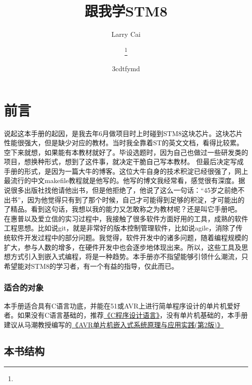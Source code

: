 \documentclass[a4paper]{book}
\title{{跟我学STM8}}
\author{Larry Cai}
\title{\huge{\savedtitle}}
\author{\textbf{\savedauthor}\thanks{}}
\date{\w3cdtfymd}
\begin{document}
\thispagestyle{empty}
\setcounter{tocdepth}{4}

\frontmatter
\chapter*{前言}

说起这本手册的起因，是我去年6月做项目时上时碰到STM8这块芯片。这块芯片性能很强大，但是缺少对应的教材。当时我全靠着ST的英文文档，看得比较累。空下来就想，如果能有本教材就好了。毕设选题时，因为自己也做过一些研发类的项目，想换种形式，想到了这件事，就决定干脆自己写本教材。 但最后决定写成手册的形式，是因为一篇大牛的博客。这位大牛自身的技术积淀已经很强了，网上最流行的中文makefile教程就是他写的。他写的博文我经常看，感觉很有深度。据说很多出版社找他请他出书，但是他拒绝了，他说了这么一句话：“45岁之前绝不出书”，因为他觉得只有到了那个时候，自己才可能得到足够的积淀，才可能出的了精品。看到这句话，我想以我的能力又怎敢称之为教材呢？还是叫它手册吧。 在惠普以及爱立信的实习过程中，我接触了很多软件方面好用的工具，成熟的软件工程思想。比如说git，就是非常好的版本控制管理软件，比如说agile，消除了传统软件开发过程中的部分问题。我觉得，软件开发中的诸多问题，随着编程规模的扩大，参与人数的增多，在硬件开发中也会逐步地体现出来。所以，这些工具及思想方式引入到嵌入式编程，将是一种趋势。本手册亦不指望能够引领什么潮流，只希望能对STM8的学习者，有一个有益的指导，仅此而已。

\subsection*{适合的对象}

本手册适合具有C语言功底，并能在51或AVR上进行简单程序设计的单片机爱好者。如果没有C语言基础的，推荐\href{http://product.china-pub.com/14975\&ref=browse}{《C程序设计语言》}，没有单片机基础的，本手册建议从马潮教授编写的\href{http://www.amazon.cn/AVR\%E5\%8D\%95\%E7\%89\%87\%E6\%9C\%BA\%E5\%B5\%8C\%E5\%85\%A5\%E5\%BC\%8F\%E7\%B3\%BB\%E7\%BB\%9F\%E5\%8E\%9F\%E7\%90\%86\%E4\%B8\%8E\%E5\%BA\%94\%E7\%94\%A8\%E5\%AE\%9E\%E8\%B7\%B5-\%E9\%A9\%AC\%E6\%BD\%AE/dp/B005GZQWB0/ref=sr\_1\_1?ie=UTF8\&qid=1335097650\&sr=8-1}{《AVR单片机嵌入式系统原理与应用实践(第2版)》}

\section*{本书结构}
\end{document}
